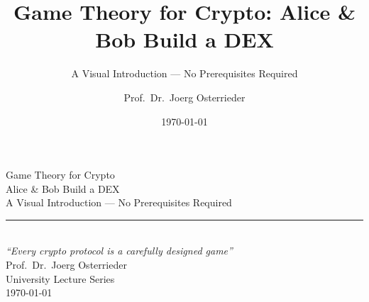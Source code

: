 \documentclass[8pt,aspectratio=169]{beamer}
\title{Game Theory for Crypto: Alice \& Bob Build a DEX}
\subtitle{A Visual Introduction --- No Prerequisites Required}
\author{Prof.~Dr.~Joerg Osterrieder}
\institute{University Lecture Series}
\date{\today}
\begin{document}
\begin{frame}[plain]
\vspace{2cm}
\begin{center}
{\Huge\color{mlpurple} Game Theory for Crypto}\\[0.4cm]
{\Large\color{mlblue} Alice \& Bob Build a DEX}\\[0.3cm]
{\normalsize A Visual Introduction --- No Prerequisites Required}\\[0.3cm]
\textcolor{mlgray}{\rule{6cm}{0.4pt}}\\[0.3cm]
{\small\itshape ``Every crypto protocol is a carefully designed game''}\\[1.5cm]
{\normalsize Prof.~Dr.~Joerg Osterrieder}\\[0.2cm]
{\small University Lecture Series}\\[0.2cm]
{\small \today}
\end{center}
\end{frame}
\end{document}
